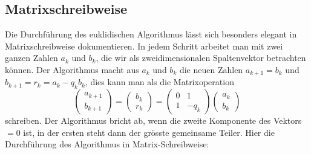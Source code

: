 \subsection{Matrixschreibweise
\label{buch:endlichekoerper:subsection:matrixschreibweise}}
Die Durchführung des euklidischen Algorithmus lässt sich besonders elegant
in Matrixschreibweise dokumentieren.
In jedem Schritt arbeitet man mit zwei ganzen Zahlen $a_k$ und $b_k$, die wir
als zweidimensionalen Spaltenvektor betrachten können.
Der Algorithmus macht aus $a_k$ und $b_k$ die neuen Zahlen
$a_{k+1} = b_k$ und $b_{k+1} = r_k = a_k - q_kb_k$, dies
kann man als die Matrixoperation
\[
\begin{pmatrix} a_{k+1} \\ b_{k+1} \end{pmatrix}
=
\begin{pmatrix} b_k \\ r_k \end{pmatrix}
=
\begin{pmatrix} 0 & 1 \\ 1 & -q_k \end{pmatrix}
\begin{pmatrix} a_{k} \\ b_{k} \end{pmatrix}
\]
schreiben.
Der Algorithmus bricht ab, wenn die zweite Komponente des Vektors $=0$ ist,
in der ersten steht dann der grösste gemeinsame Teiler.
Hier die Durchführung des Algorithmus in Matrix-Schreibweise:
